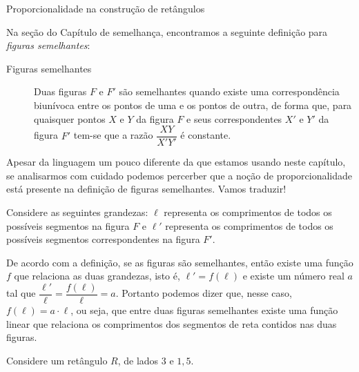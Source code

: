 \begin{task}{Proporcionalidade na construção de retângulos}
\label{ativ-prop-retangulo}



Na seção {\hyperref[\detokenize{GE202-0:sec-semelhanca-organizando1}]{}} do Capítulo de semelhança, encontramos a seguinte definição para \emph{figuras semelhantes}:
\begin{description}
\item[{Figuras semelhantes}] \leavevmode{}\label{\detokenize{AF107-1:term-figuras-semelhantes}}
Duas figuras \(F\) e \(F'\) são semelhantes quando existe uma correspondência biunívoca entre os pontos de uma e os pontos de outra, de forma que, para quaisquer pontos \(X\) e \(Y\) da figura \(F\) e seus correspondentes \(X'\) e \(Y'\) da figura \(F'\) tem-se que a razão \(\dfrac{XY}{X'Y'}\)   é constante.

\end{description}

Apesar da linguagem um pouco diferente da que estamos usando neste capítulo, se analisarmos com cuidado podemos percerber que a noção de proporcionalidade está presente na definição de figuras semelhantes. Vamos traduzir!

Considere as seguintes grandezas: \(\ell\) representa os comprimentos de todos os possíveis segmentos na figura \(F\) e \(\ell'\) representa os comprimentos de todos os possíveis segmentos correspondentes na figura \(F'\).

De acordo com a definição, se as figuras são semelhantes, então existe uma função \(f\) que relaciona as duas grandezas, isto é, \(\ell'=f(\ell)\) e existe um número real \(a\) tal que \(\dfrac{\ell'}\ell = \dfrac{f(\ell)}\ell = a\). Portanto podemos dizer que, nesse caso, \(f(\ell)=a\cdot\ell\), ou seja, que entre duas figuras semelhantes existe uma função linear que relaciona os comprimentos dos segmentos de reta contidos nas duas figuras.

Considere um retângulo \(R\), de lados \(3\) e \(1,5\).

\begin{center}
\end{center}


\end{task}
